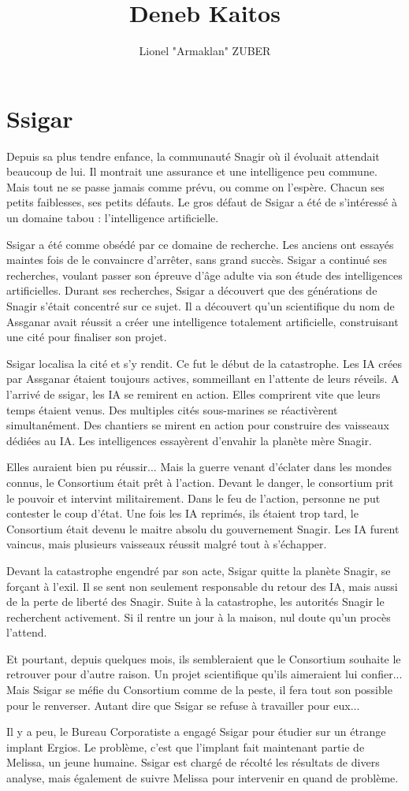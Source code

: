 \documentclass{DenebClass}
\title{Deneb Kaitos}
\author{Lionel "Armaklan" ZUBER}
\begin{document}
\chapter*{Ssigar}

Depuis sa plus tendre enfance, la communauté Snagir où il évoluait attendait beaucoup de lui. Il montrait une assurance et une intelligence peu commune. Mais tout ne se passe jamais comme prévu, ou comme on l'espère. Chacun ses petits faiblesses, ses petits défauts. Le gros défaut de Ssigar a été de s'intéressé à un domaine tabou : l'intelligence artificielle.

Ssigar a été comme obsédé par ce domaine de recherche. Les anciens ont essayés maintes fois de le convaincre d'arrêter, sans grand succès. Ssigar a continué ses recherches, voulant passer son épreuve d'âge adulte via son étude des intelligences artificielles. Durant ses recherches, Ssigar a découvert que des générations de Snagir s'était concentré sur ce sujet. Il a découvert qu'un scientifique du nom de Assganar avait réussit a créer une intelligence totalement artificielle, construisant une cité pour finaliser son projet.

Ssigar localisa la cité et s'y rendit. Ce fut le début de la catastrophe. Les IA crées par Assganar étaient toujours actives, sommeillant en l'attente de leurs réveils. A l'arrivé de ssigar, les IA se remirent en action. Elles comprirent vite que leurs temps étaient venus. Des multiples cités sous-marines se réactivèrent simultanément. Des chantiers se mirent en action pour construire des vaisseaux dédiées au IA. Les intelligences essayèrent d'envahir la planète mère Snagir. 

Elles auraient bien pu réussir... Mais la guerre venant d'éclater dans les mondes connus, le Consortium était prêt à l'action. Devant le danger, le consortium prit le pouvoir et intervint militairement. Dans le feu de l'action, personne ne put contester le coup d'état. Une fois les IA reprimés, ils étaient trop tard, le Consortium était devenu le maitre absolu du gouvernement Snagir. Les IA furent vaincus, mais plusieurs vaisseaux réussit malgré tout à s'échapper. 

Devant la catastrophe engendré par son acte, Ssigar quitte la planète Snagir, se forçant à l'exil. Il se sent non seulement responsable du retour des IA, mais aussi de la perte de liberté des Snagir. Suite à la catastrophe, les autorités Snagir le recherchent activement. Si il rentre un jour à la maison, nul doute qu'un procès l'attend. 

Et pourtant, depuis quelques mois, ils sembleraient que le Consortium souhaite le retrouver pour d'autre raison. Un projet scientifique qu'ils aimeraient lui confier... Mais Ssigar se méfie du Consortium comme de la peste, il fera tout son possible pour le renverser. Autant dire que Ssigar se refuse à travailler pour eux...

Il y a peu, le Bureau Corporatiste a engagé Ssigar pour étudier sur un étrange implant Ergios. Le problème, c'est que l'implant fait maintenant partie de Melissa, un jeune humaine. Ssigar est chargé de récolté les résultats de divers analyse, mais également de suivre Melissa pour intervenir en quand de problème.
\end{document}
